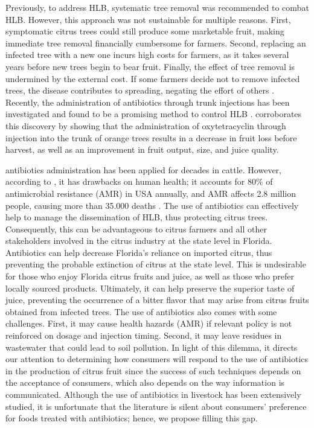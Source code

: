 \documentclass[12pt]{article}
\begin{document}
{Previously, to address HLB, systematic tree removal was recommended to combat HLB. However, this approach was not sustainable for multiple reasons. First, symptomatic citrus trees could still produce some marketable fruit, making immediate tree removal financially cumbersome for farmers. Second, replacing an infected tree with a new one incurs high costs for farmers, as it takes several years before new trees begin to bear fruit.  Finally, the effect of tree removal is undermined by the external cost. If some farmers decide not to remove infected trees, the disease contributes to spreading, negating the effort of others \citep{farnsworth_potential_2024}. Recently, the administration of antibiotics through trunk injections has been investigated and found to be a promising method to control HLB \citep{li_precision_2022}. \citet{archer_trunk_2023} corroborates this discovery by showing that the administration of oxytetracyclin through injection into the trunk of orange trees results in a decrease in fruit loss before harvest, as well as an improvement in fruit output, size, and juice quality.

antibiotics administration has been applied for decades in cattle. However, according to \citet{hosain_antimicrobial_2021}, it has drawbacks on human health; it accounts for 80\% of antimicrobial resistance (AMR) in USA annually, and AMR affects 2.8 million people, causing more than 35.000 deaths \citep{cdc2019antibiotic}.  The use of antibiotics can effectively help to manage the dissemination of HLB, thus protecting citrus trees. Consequently, this can be advantageous to citrus farmers and all other stakeholders involved in the citrus industry at the state level in Florida. Antibiotics can help decrease Florida's reliance on imported citrus, thus preventing the probable extinction of citrus at the state level. This is undesirable for those who enjoy Florida citrus fruits and juice, as well as those who prefer locally sourced products. Ultimately, it can help preserve the superior taste of juice, preventing the occurrence of a bitter flavor that may arise from citrus fruits obtained from infected trees. The use of antibiotics also comes with some challenges. First, it may cause health hazards (AMR) if relevant policy is not reinforced on dosage and injection timing. Second, it may leave  residues in wastewater that could lead to soil pollution. In light of this dilemma, it directs our attention to determining how consumers will respond to the use of antibiotics in the production of citrus fruit since the success of such techniques depends on the acceptance of consumers, which also depends on the way information is communicated. Although the use of antibiotics in livestock has been extensively studied, it is unfortunate that the literature is silent about consumers’ preference for foods treated with antibiotics; hence, we propose filling this gap.

}
\end{document}
